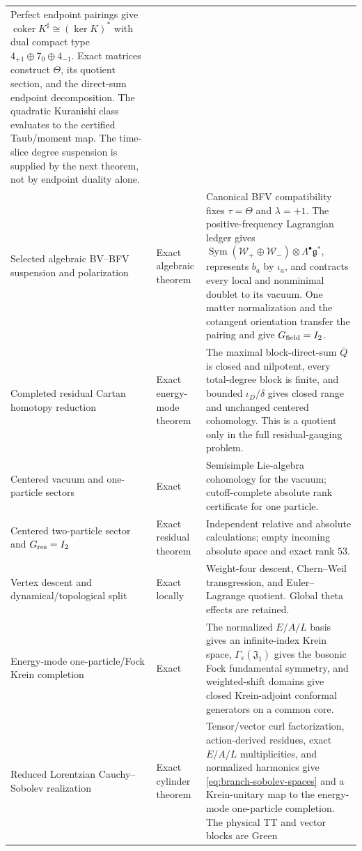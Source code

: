 \documentclass[11pt]{article}
\theoremstyle{definition}
\theoremstyle{remark}
\newcommand{\g}{\mathfrak g}
\newcommand{\W}{\mathcal W}
\begin{document}
{\begin{longtable}{>{\raggedright\arraybackslash}p{}
                >{\raggedright\arraybackslash}p{}
                >{\raggedright\arraybackslash}p{}}
Perfect endpoint pairings give
$\operatorname{coker}K^\sharp\cong(\ker K)^*$ with dual compact type
$4_{+1}\oplus7_0\oplus4_{-1}$.  Exact matrices construct $\Theta$, its
quotient section, and the direct-sum endpoint decomposition.  The quadratic
Kuranishi class evaluates to the certified Taub/moment map.  The time-slice
degree suspension is supplied by the next theorem, not by endpoint duality
alone.\\
Selected algebraic BV--BFV suspension and polarization & Exact algebraic
theorem & Canonical BFV compatibility fixes $\tau=\Theta$ and $\lambda=+1$.
The positive-frequency Lagrangian ledger gives
$\operatorname{Sym}(\W_+\oplus\W_-)\otimes\Lambda^\bullet\g^*$, represents
$b_a$ by $\iota_a$, and contracts every local and nonminimal doublet to its
vacuum.  One matter normalization and the cotangent orientation transfer the
pairing and give $G_{\rm field}=I_2$.\\
Completed residual Cartan homotopy reduction & Exact energy-mode theorem &
The maximal block-direct-sum $\overline Q$ is closed and nilpotent, every
total-degree block is finite, and bounded $\iota_D/\delta$ gives closed
range and unchanged centered cohomology.  This is a quotient only in the
full residual-gauging problem.\\
Centered vacuum and one-particle sectors & Exact & Semisimple Lie-algebra
cohomology for the vacuum; cutoff-complete absolute rank certificate for
one particle.\\
Centered two-particle sector and $G_{\rm res}=I_2$ & Exact residual theorem &
Independent relative and absolute calculations; empty incoming absolute
space and exact rank $53$.\\
Vertex descent and dynamical/topological split & Exact locally & Weight-four
descent, Chern--Weil transgression, and Euler--Lagrange quotient.  Global
theta effects are retained.\\
Energy-mode one-particle/Fock Krein completion & Exact & The normalized
$E/A/L$ basis gives an infinite-index Krein space, $\Gamma_s(\mathfrak J_1)$
gives the bosonic Fock fundamental symmetry, and weighted-shift domains give
closed Krein-adjoint conformal generators on a common core.\\
Reduced Lorentzian Cauchy--Sobolev realization & Exact cylinder theorem &
Tensor/vector curl factorization, action-derived residues, exact $E/A/L$
multiplicities, and normalized harmonics give
\eqref{eq:branch-sobolev-spaces} and a Krein-unitary map to the energy-mode
one-particle completion.  The physical TT and vector blocks are Green

\end{longtable}}
\end{document}
